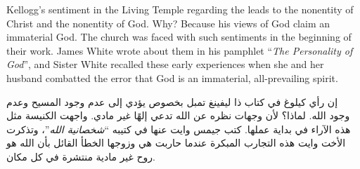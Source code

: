 Kellogg’s sentiment in the Living Temple regarding the  leads to the nonentity of Christ and the nonentity of God. Why? Because his views of God claim an immaterial God. The church was faced with such sentiments in the beginning of their work. James White wrote about them in his pamphlet “\textit{The Personality of God}”, and Sister White recalled these early experiences when she and her husband combatted the error that God is an immaterial, all-prevailing spirit.


إن رأي كيلوغ في كتاب ذا ليفينغ تمبل بخصوص  يؤدي إلى عدم وجود المسيح وعدم وجود الله. لماذا؟ لأن وجهات نظره عن الله تدعي إلهًا غير مادي. واجهت الكنيسة مثل هذه الآراء في بداية عملها. كتب جيمس وايت عنها في كتيبه “\textit{شخصانية الله}”، وتذكرت الأخت وايت هذه التجارب المبكرة عندما حاربت هي وزوجها الخطأ القائل بأن الله هو روح غير مادية منتشرة في كل مكان.


